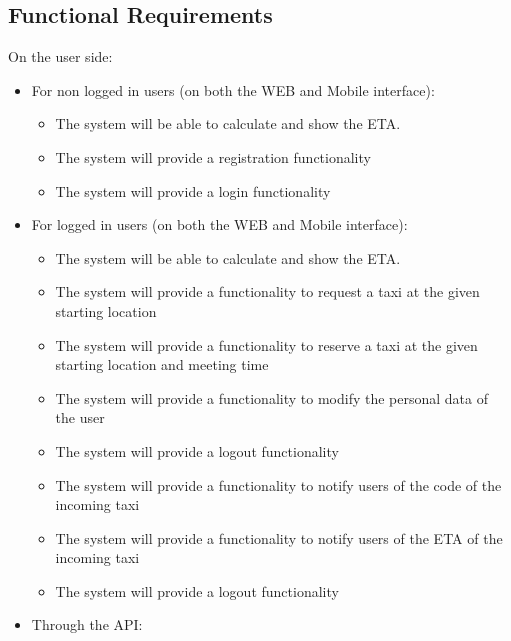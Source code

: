 \documentclass{article}
\begin{document}
\subsection{Functional Requirements}
On the user side:\@
\begin{itemize}
	\item For non logged in users (on both the WEB and Mobile interface):
		\begin{itemize}
			\item The system will be able to calculate and show the ETA.\@ 
			\item The system will provide a registration functionality 
			\item The system will provide a login functionality
		\end{itemize}
	\item For logged in users (on both the WEB and Mobile interface):
		\begin{itemize}
			\item The system will be able to calculate and show the ETA.\@ 
			\item The system will provide a functionality to request a taxi at the given starting location 
			\item The system will provide a functionality to reserve a taxi at the given starting location and meeting time
			\item The system will provide a functionality to modify the personal data of the user
			\item The system will provide a logout functionality
			\item The system will provide a functionality to notify users of the code of the incoming taxi
			\item The system will provide a functionality to notify users of the ETA of the incoming taxi
			\item The system will provide a logout functionality
		\end{itemize}
	\item Through the API:\@ %
		\begin{itemize}

\end{itemize}
\end{itemize}
\end{document}
